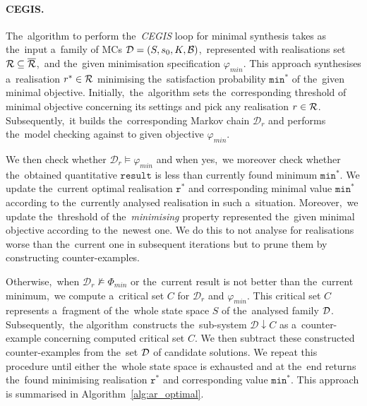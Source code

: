 \paragraph{CEGIS.}
The~algorithm to perform the~\textit{CEGIS} loop for minimal synthesis takes as the~input a~family of MCs $\mathcal{D} = (S,s_{0},K,\mathcal{B})$,~represented with realisations set $\mathcal{R} \subseteq \overline{\mathcal{R}}$,~and the~given minimisation specification $\varphi_{min}$.
This approach synthesises a~realisation $r^* \in \mathcal{R}$ minimising the~satisfaction probability $\mathtt{min^*}$ of the~given minimal objective.
Initially,~the~algorithm sets the~corresponding threshold of minimal objective concerning its settings and pick any realisation $r \in \mathcal{R}$.
Subsequently,~it builds the~corresponding Markov chain $\mathcal{D}_r$ and performs the~model checking against to given objective $\varphi_{min}$.

We then check whether $\mathcal{D}_r \models \varphi_{min}$ and when yes,~we moreover check whether the~obtained quantitative $\mathtt{result}$ is less than currently found minimum $\mathtt{min^*}$.
We update the~current optimal realisation $\mathtt{r^*}$ and corresponding minimal value $\mathtt{min^*}$ according to the~currently analysed realisation in such a~situation.
Moreover,~we update the~threshold of the~\textit{minimising} property represented the~given minimal objective according to the~newest one.
We do this to not analyse for realisations worse than the~current one in subsequent iterations but to prune them by constructing counter-examples.

Otherwise,~when $\mathcal{D}_r \not\models \varPhi_{min}$ or the~current result is not better than the~current minimum,~we compute a~critical set $C$ for $\mathcal{D}_r$ and $\varphi_{min}$.
This critical set $C$ represents a~fragment of the~whole state space $S$ of the~analysed family $\mathcal{D}$.
Subsequently,~the algorithm~constructs the~sub-system $\mathcal{D}\!\downarrow\!C$ as a~counter-example concerning computed critical set $C$.
We then subtract these constructed counter-examples from the~set $\mathcal{D}$ of candidate solutions. 
We repeat this procedure until either the~whole state space is exhausted and at the~end returns the~found minimising realisation $\mathtt{r^*}$ and corresponding value $\mathtt{min^*}$.
This approach is summarised in Algorithm~\ref{alg:ar_optimal}.

